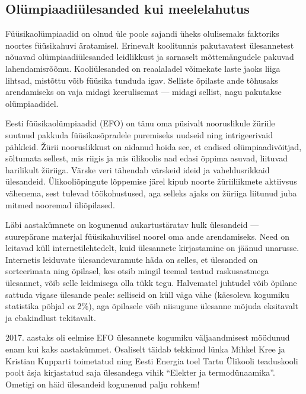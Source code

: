\documentclass[11pt]{article}
\begin{document}
{\newpage
\subsection*{Olümpiaadiülesanded kui meelelahutus}
{
Füüsikaolümpiaadid on olnud üle poole sajandi üheks olulisemaks faktoriks noortes füüsikahuvi äratamisel.
Erinevalt koolitunnis pakutavatest ülesannetest nõuavad olümpiaadiülesanded leidlikkust ja sarnaselt
mõttemängudele pakuvad lahendamisrõõmu. Kooliülesanded on reaalaladel võimekate laste jaoks liiga lihtsad, mistõttu
võib füüsika tunduda igav. Selliste õpilaste ande tõhusaks arendamiseks on vaja
midagi keerulisemat --- midagi sellist, nagu pakutakse olümpiaadidel.

Eesti füüsikaolümpiaadid (EFO) on tänu oma püsivalt nooruslikule žüriile suutnud pakkuda füüsikasõpradele puremiseks
uudseid ning intrigeerivaid pähkleid.
Žürii nooruslikkust on aidanud hoida see, et endised olümpiaadivõitjad, sõltumata sellest, mis riigis ja mis ülikoolis nad edasi õppima asuvad, liituvad harilikult žüriiga.
Värske veri tähendab värskeid ideid ja vaheldusrikkaid ülesandeid.
Ülikooliõpingute lõppemise järel kipub noorte žüriiliikmete aktiivsus vähenema, sest tulevad töökohustused,
aga selleks ajaks on žüriiga liitunud juba mitmed nooremad üliõpilased.

Läbi aastakümnete on kogunenud aukartustäratav hulk ülesandeid ---
suurepärane materjal füüsikahuvilisel noorel oma ande arendamiseks.
Need on leitavad küll internetilehtedelt, kuid ülesannete
kirjastamine on jäänud unarusse. Internetis leiduvate
ülesandevaramute häda on selles, et ülesanded on
sorteerimata ning õpilasel, kes otsib mingil teemal
teatud raskusastmega ülesannet, võib selle leidmisega olla tükk tegu.
Halvematel juhtudel võib õpilane sattuda vigase ülesande peale:
selliseid on küll väga vähe (käesoleva kogumiku statistika põhjal \textit{ca} 2\%),
aga õpilasele võib niisugune ülesanne mõjuda eksitavalt ja ebakindlust tekitavalt.

2017. aastaks oli eelmise EFO ülesannete kogumiku väljaandmisest möödunud enam kui kaks aastakümmet.
Osaliselt täidab tekkinud lünka Mihkel Kree ja Kristian Kupparti toimetatud ning Eesti Energia toel Tartu Ülikooli
teaduskooli poolt äsja kirjastatud saja ülesandega vihik ``Elekter ja termodünaamika''. Ometigi on häid
ülesandeid kogunenud palju rohkem!

}}
\end{document}
